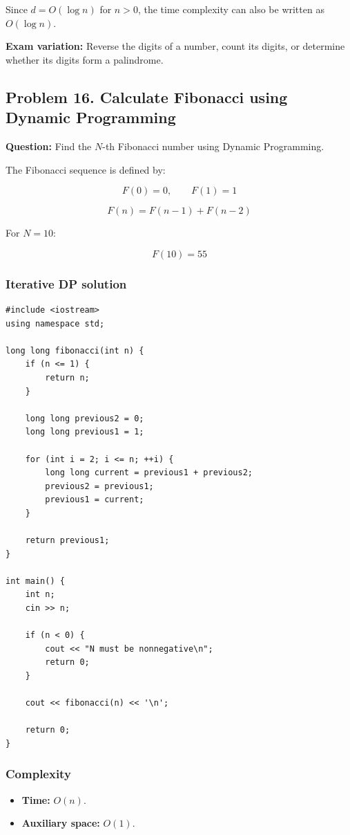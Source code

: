 Since $d=O(\log n)$ for $n>0$, the time complexity can also be written as $O(\log n)$.

\textbf{Exam variation:} Reverse the digits of a number, count its digits, or determine whether its digits form a palindrome.

\subsection{Problem 16. Calculate Fibonacci using Dynamic Programming}

\textbf{Question:} Find the $N$-th Fibonacci number using Dynamic Programming.

The Fibonacci sequence is defined by:


\[
F(0)=0,\qquad F(1)=1
\]



\[
\boxed{F(n)=F(n-1)+F(n-2)}
\]


For $N=10$:


\[
F(10)=\boxed{55}
\]


\subsubsection{Iterative DP solution}

\begin{lstlisting}[style=cppstyle]
#include <iostream>
using namespace std;

long long fibonacci(int n) {
    if (n <= 1) {
        return n;
    }

    long long previous2 = 0;
    long long previous1 = 1;

    for (int i = 2; i <= n; ++i) {
        long long current = previous1 + previous2;
        previous2 = previous1;
        previous1 = current;
    }

    return previous1;
}

int main() {
    int n;
    cin >> n;

    if (n < 0) {
        cout << "N must be nonnegative\n";
        return 0;
    }

    cout << fibonacci(n) << '\n';

    return 0;
}
\end{lstlisting}

\subsubsection{Complexity}

\begin{itemize}
    \item \textbf{Time:} $O(n)$.
    \item \textbf{Auxiliary space:} $O(1)$.
\end{itemize}

